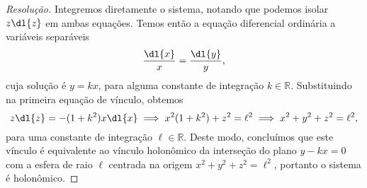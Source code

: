 \begin{proof}[Resolução]
    Integremos diretamente o sistema, notando que podemos isolar \(z \dl{z}\) em ambas equações. Temos então a equação diferencial ordinária a variáveis separáveis
    \begin{equation*}
        \frac{\dl{x}}{x} = \frac{\dl{y}}{y},
    \end{equation*}
    cuja solução é \(y = kx\), para alguma constante de integração \(k \in \mathbb{R}\). Substituindo na primeira equação de vínculo, obtemos
    \begin{equation*}
        z \dl{z} = - (1 + k^2)x \dl{x} \implies x^2(1 + k^2) +  z^2 = \ell^2 \implies x^2 + y^2 + z^2 = \ell^2,
    \end{equation*}
    para uma constante de integração \(\ell \in \mathbb{R}\). Deste modo, concluímos que este vínculo é equivalente ao vínculo holonômico da interseção do plano \(y - kx = 0\) com a esfera de raio \(\ell\) centrada na origem \(x^2 + y^2 + z^2 = \ell^2\), portanto o sistema é holonômico.
\end{proof}
